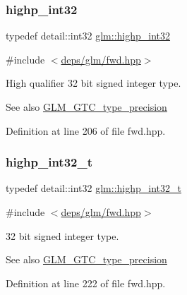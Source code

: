 \subsubsection{\texorpdfstring{highp\+\_\+int32}{highp\_int32}}
{\footnotesize\ttfamily typedef detail\+::int32 \hyperlink{group__gtc__type__precision_gaa2045c92b9553d463191af6a20e997bb}{glm\+::highp\+\_\+int32}}



{\ttfamily \#include $<$\hyperlink{fwd_8hpp}{deps/glm/fwd.\+hpp}$>$}

High qualifier 32 bit signed integer type. \begin{DoxySeeAlso}{See also}
\hyperlink{group__gtc__type__precision}{G\+L\+M\+\_\+\+G\+T\+C\+\_\+type\+\_\+precision} 
\end{DoxySeeAlso}


Definition at line 206 of file fwd.\+hpp.

\mbox{\label{group__gtc__type__precision_ga783d077a513c1f475f6cdb406b4238c3}} 
\subsubsection{\texorpdfstring{highp\+\_\+int32\+\_\+t}{highp\_int32\_t}}
{\footnotesize\ttfamily typedef detail\+::int32 \hyperlink{group__gtc__type__precision_ga783d077a513c1f475f6cdb406b4238c3}{glm\+::highp\+\_\+int32\+\_\+t}}



{\ttfamily \#include $<$\hyperlink{fwd_8hpp}{deps/glm/fwd.\+hpp}$>$}

32 bit signed integer type. \begin{DoxySeeAlso}{See also}
\hyperlink{group__gtc__type__precision}{G\+L\+M\+\_\+\+G\+T\+C\+\_\+type\+\_\+precision} 
\end{DoxySeeAlso}


Definition at line 222 of file fwd.\+hpp.

\mbox{\label{group__gtc__type__precision_ga7ffb27943e9569800979081bc548621c}} 
